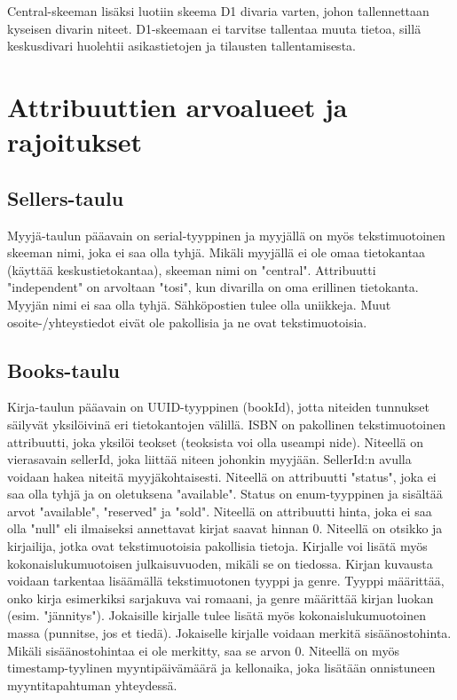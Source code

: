 \documentclass[11pt,a4paper]{article}
\begin{document}
Central-skeeman lisäksi luotiin skeema D1 divaria varten, johon tallennettaan kyseisen divarin niteet. D1-skeemaan ei tarvitse tallentaa muuta tietoa, sillä keskusdivari huolehtii asikastietojen ja tilausten tallentamisesta.

\section{Attribuuttien arvoalueet ja rajoitukset}

\subsection{Sellers-taulu}

Myyjä-taulun pääavain on serial-tyyppinen ja myyjällä on myös tekstimuotoinen skeeman nimi, joka ei saa olla tyhjä. Mikäli myyjällä ei ole omaa tietokantaa (käyttää keskustietokantaa), skeeman nimi on "central". Attribuutti "independent" on arvoltaan "tosi", kun divarilla on oma erillinen tietokanta. Myyjän nimi ei saa olla tyhjä. Sähköpostien tulee olla uniikkeja. Muut osoite-/yhteystiedot eivät ole pakollisia ja ne ovat tekstimuotoisia.

\subsection{Books-taulu}

Kirja-taulun pääavain on UUID-tyyppinen (bookId), jotta niteiden tunnukset säilyvät yksilöivinä eri tietokantojen välillä. ISBN on pakollinen tekstimuotoinen attribuutti, joka yksilöi teokset (teoksista voi olla useampi nide). Niteellä on vierasavain sellerId, joka liittää niteen johonkin myyjään. SellerId:n avulla voidaan hakea niteitä myyjäkohtaisesti. Niteellä on attribuutti "status", joka ei saa olla tyhjä ja on oletuksena "available". Status on enum-tyyppinen ja sisältää arvot "available", "reserved" ja "sold". Niteellä on attribuutti hinta, joka ei saa olla "null" eli ilmaiseksi annettavat kirjat saavat hinnan 0. Niteellä on otsikko ja kirjailija, jotka ovat tekstimuotoisia pakollisia tietoja. Kirjalle voi lisätä myös kokonaislukumuotoisen julkaisuvuoden, mikäli se on tiedossa. Kirjan kuvausta voidaan tarkentaa lisäämällä tekstimuotonen tyyppi ja genre. Tyyppi määrittää, onko kirja esimerkiksi sarjakuva vai romaani, ja genre määrittää kirjan luokan (esim. "jännitys"). Jokaisille kirjalle tulee lisätä myös kokonaislukumuotoinen massa (punnitse, jos et tiedä). Jokaiselle kirjalle voidaan merkitä sisäänostohinta. Mikäli sisäänostohintaa ei ole merkitty, saa se arvon 0. Niteellä on myös timestamp-tyylinen myyntipäivämäärä ja kellonaika, joka lisätään onnistuneen myyntitapahtuman yhteydessä.
\end{document}

